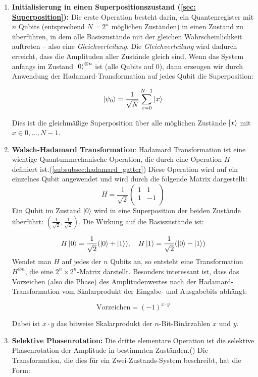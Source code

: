 \begin{enumerate}
    \item \textbf{Initialisierung in einen Superpositionszustand (\ref{sec: Superposition}):} 
    Die erste Operation besteht darin, ein Quantenregister mit $n$ Qubits (entsprechend $N = 2^{n}$ möglichen Zuständen) in einen Zustand zu überführen, in dem alle Basiszustände mit der gleichen Wahrscheinlichkeit auftreten – also eine \textit{Gleichverteilung}. Die \textit{Gleichverteilung} wird dadurch erreicht, dass die Amplituden aller Zustände gleich sind. Wenn das System anfangs im Zustand $\ket{0}^{\otimes n}$ ist (alle Qubits auf 0), dann erzeugen wir durch Anwendung der Hadamard-Transformation auf jedes Qubit die Superposition:

$$
\ket{\psi_0} = \frac{1}{\sqrt{N}} \sum_{x=0}^{N-1} \ket{x}
$$

Dies ist die gleichmäßige Superposition über alle möglichen Zustände $\ket{x}$ mit $x \in {0, \ldots, N-1}$.\\
    \item \textbf{Walsch-Hadamard Transformation}: Hadamard Transformation ist eine wichtige Quantummechanische Operation, die durch eine Operation $H$ definiert ist.(\ref{subsubsec:hadamard_gatter}) Diese Operation wird auf ein einzelnes Qubit angewendet und wird durch die folgende Matrix dargestellt:
    $$
H = \frac{1}{\sqrt{2}} \begin{pmatrix}
1 & 1 \\
1 & -1 \\
\end{pmatrix}
$$
Ein Qubit im Zustand \( \lvert 0 \rangle \) wird in eine Superposition der beiden Zustände überführt: \( \left( \frac{1}{\sqrt{2}}, \frac{1}{\sqrt{2}} \right) \). Die Wirkung auf die Basiszustände ist:

$$
H\ket{0} = \frac{1}{\sqrt{2}}(\ket{0} + \ket{1}), \quad H\ket{1} = \frac{1}{\sqrt{2}}(\ket{0} - \ket{1})
$$
Wendet man $H$ auf jedes der $n$ Qubits an, so entsteht eine Transformation $H^{\otimes n}$, die eine $2^n \times 2^n$-Matrix darstellt.
Besonders interessant ist, dass das Vorzeichen (also die Phase) des Amplitudenwertes nach der Hadamard-Transformation vom Skalarprodukt der Eingabe- und Ausgabebits abhängt:

$$
\text{Vorzeichen} = (-1)^{x \cdot y}
$$

Dabei ist $x \cdot y$ das bitweise Skalarprodukt der $n$-Bit-Binärzahlen $x$ und $y$.\\

    \item \textbf{Selektive Phasenrotation:} Die dritte elementare Operation ist die selektive Phasenrotation der Amplitude in bestimmten Zuständen.(\cite{zotero-1211}) Die Transformation, die dies für ein Zwei-Zustands-System beschreibt, hat die Form:


\end{enumerate}
